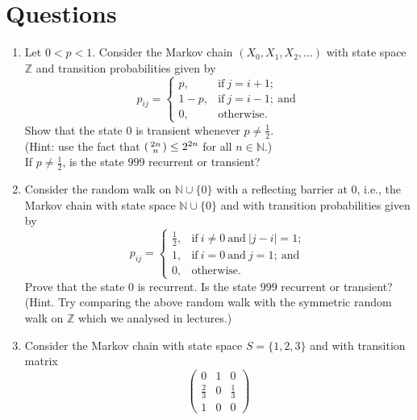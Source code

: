 \documentclass[11pt,a4paper]{article}
\newenvironment{psmallmatrix}
  {\left(\begin{smallmatrix}}
  {\end{smallmatrix}\right)}
\begin{document}
    \section*{Questions}
    \begin{enumerate}
      \item Let $0 < p < 1$. Consider the Markov chain $(X_0, X_1, X_2, \ldots)$ with state space $\mathbb{Z}$ and transition probabilities given by
      $$
      p_{ij}
      =
      \begin{cases}
        p, & \text{if}\ j = i + 1;\\
        1-p, & \text{if}\ j = i − 1;\ \text{and}\\
        0, & \text{otherwise}.
      \end{cases}
      $$
      Show that the state 0 is transient whenever $p \neq \frac{1}{2}$.\\
      (Hint: use the fact that 
      $
      \begin{psmallmatrix}
        2n \\ n
      \end{psmallmatrix}
      \leq
      2^{2n}
      $
      for all $n \in \mathbb{N}$.)\\
      If $p \neq \frac{1}{2}$, is the state $999$ recurrent or transient?
      \item  Consider the random walk on $\mathbb{N} \cup \{0\}$ with a reflecting barrier at $0$, i.e., the Markov chain with state space $\mathbb{N} \cup \{0\}$ and with transition probabilities given by
      $$
      p_{ij}
      =
      \begin{cases}
        \frac{1}{2}, & \text{if}\ i \neq 0\ \text{and}\ |j − i| = 1;\\
        1, & \text{if}\ i = 0\ \text{and}\ j = 1;\ \text{and}\\
        0, & \text{otherwise}.
      \end{cases}
      $$
      Prove that the state $0$ is recurrent. Is the state $999$ recurrent or transient?\\
      (Hint. Try comparing the above random walk with the symmetric random walk on $\mathbb{Z}$ which we analysed in lectures.)
      \item Consider the Markov chain with state space $S = \{1, 2, 3\}$ and with transition matrix
      $$
      \begin{pmatrix}
        0 & 1 & 0\\
        \frac{2}{3} & 0 & \frac{1}{3}\\
        1 & 0 & 0

\end{pmatrix}$$
\end{enumerate}
\end{document}

